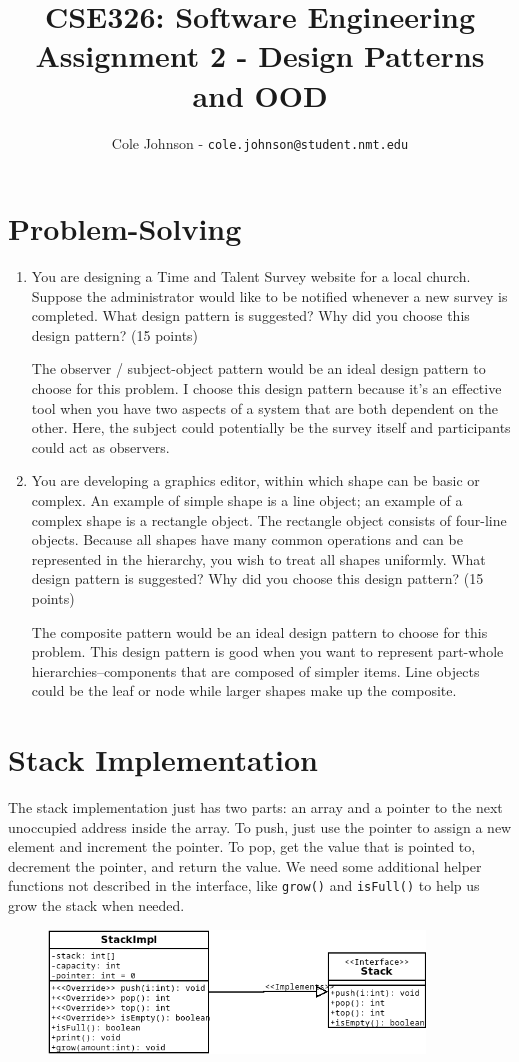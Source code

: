 \documentclass[english,12pt]{article}
\author{
    Cole Johnson - \texttt{cole.johnson@student.nmt.edu}
}
\title{
    \textbf{CSE326: Software Engineering} \\
    \LARGE{Assignment 2 - Design Patterns and OOD}
}
\begin{document}
 \maketitle
 \section*{Problem-Solving}
 \frenchspacing
 \begin{enumerate}[\bf (1.)]
  \item You are designing a Time and Talent Survey website for a local church. 
  Suppose the administrator would like to be notified whenever a new survey is completed.
  What design pattern is suggested? Why did you choose 
  this design pattern? (15 points)

  The observer / subject-object pattern would be an ideal design pattern to choose for this problem.
  I choose this design pattern because it's an effective tool when you have two aspects of a
  system that are both dependent on the other. Here, the subject could potentially be the survey 
  itself and participants could act as observers. 

  \item You are developing a graphics editor, within which shape can be basic or complex. 
  An example of simple shape is a line object; an example of a complex shape 
  is a rectangle object. The rectangle object consists of four-line objects. 
  Because all shapes have many common operations and can be represented in the 
  hierarchy, you wish to treat all shapes uniformly.
  What design pattern is suggested? Why did you choose this design pattern? 
  (15 points)

 The composite pattern would be an ideal design pattern to choose for this problem.
 This design pattern is good when you want to represent part-whole hierarchies--components
 that are composed of simpler items. Line objects could be the leaf or node while
 larger shapes make up the composite.
 \end{enumerate}
\pagebreak
\section*{Stack Implementation}
The stack implementation just has two parts: an array and a pointer to the next
unoccupied address inside the array. To push, just use the pointer to assign a new
element and increment the pointer. To pop, get the value that is pointed to,
decrement the pointer, and return the value. We need some additional helper functions
not described in the interface, like \texttt{grow()} and \texttt{isFull()} to help 
us grow the stack when needed.
\begin{figure}[H]
   \includegraphics[width=10cm]{diagrams/StackImp.png}
\end{figure}
\end{document}
